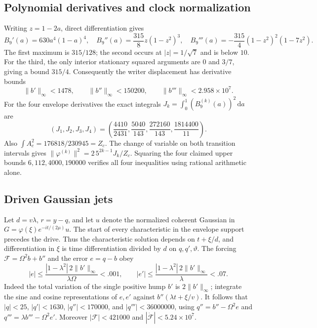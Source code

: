 \documentclass[11pt]{article}
\theoremstyle{definition}\newtheorem{definition}[theorem]{Definition}
\theoremstyle{remark}\newtheorem{remark}[theorem]{Remark}
\newcommand{\dd}{\,\mathrm d}\newcommand{\Imv}{\operatorname{Im}}\newcommand{\ii}{\mathrm i}
\begin{document}
\subsection{Polynomial derivatives and clock normalization}
Writing $z=1-2a$, direct differentiation gives
\[
 B_9'(a)=630a^4(1-a)^4,\quad
 B_9''(a)=\frac{315}{8}z(1-z^2)^3,\quad
 B_9'''(a)=-\frac{315}{4}(1-z^2)^2(1-7z^2).
\]
The first maximum is $315/128$; the second occurs at
$|z|=1/\sqrt7$ and is below $10$. For the third, the only interior
stationary squared arguments are $0$ and $3/7$, giving a bound $315/4$.
Consequently the writer displacement has derivative bounds
\[
 \|b'\|_\infty<1478,\qquad \|b''\|_\infty<150200,
 \qquad \|b'''\|_\infty<2.958\times10^7.
\]
For the four envelope derivatives the exact integrals
$J_k=\int_0^1(B_9^{(k)}(a))^2\dd a$ are
\[
 (J_1,J_2,J_3,J_4)
 =\left(\frac{4410}{2431},\frac{5040}{143},
              \frac{272160}{143},\frac{1814400}{11}\right).
\]
Also $\int A_c^2=176818/230945=Z_c$. The change of variable on
both transition intervals gives
$\|\varphi^{(k)}\|^2=2\,5^{2k-1}J_k/Z_c$.
Squaring the four claimed upper bounds $6,112,4000,190000$ verifies
all four inequalities using rational arithmetic alone.

\subsection{Driven Gaussian jets}
Let $d=v\lambda$, $r=y-q$, and let $u$ denote the normalized coherent
Gaussian in $G=\varphi(\xi)e^{-it/(2\mu)}u$. The start of every
characteristic in the envelope support precedes the drive. Thus the
characteristic solution depends on $t+\xi/d$, and differentiation in
$\xi$ is time differentiation divided by $d$ on $q,q',\vartheta$.
The forcing $\mathcal F=\Omega^2b+b''$ and the error $e=q-b$ obey
\[
 |e|\le\frac{|1-\lambda^2|\,2\|b'\|_\infty}{\lambda\Omega}<.001,
 \qquad
 |e'|\le\frac{|1-\lambda^2|\,2\|b'\|_\infty}{\lambda}<.07.
\]
Indeed the total variation of the single positive hump $b'$ is
$2\|b'\|_\infty$; integrate the sine and cosine representations
of $e,e'$ against $b''(\lambda t+\xi/v)$. It follows that
$|q|<25$, $|q'|<1630$, $|q''|<170000$, and
$|q'''|<36000000$, using
$q''=b''-\Omega^2e$ and $q'''=\lambda b'''-\Omega^2e'$.
Moreover $|\mathcal F|<421000$ and
$|\dot{\mathcal F}|<5.24\times10^7$.
\end{document}
